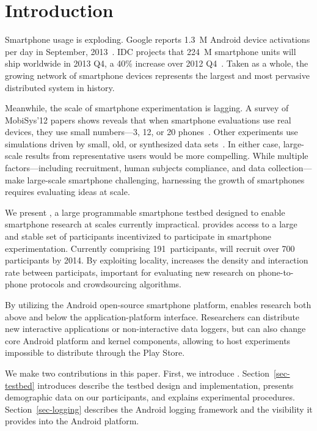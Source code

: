 \section{Introduction}
\label{sec-introduction}

Smartphone usage is exploding. Google reports 1.3~M Android device activations
per day in September, 2013~\cite{google-Sep2012-activations}. IDC projects that
224~M smartphone units will ship worldwide in 2013 Q4, a 40\% increase over
2012 Q4~\cite{idc-smartphone-growth}. Taken as a whole, the growing network of
smartphone devices represents the largest and most pervasive distributed system
in history.

Meanwhile, the scale of smartphone experimentation is lagging. A survey of
MobiSys'12 papers shows reveals that when smartphone evaluations use real
devices, they use small numbers---3, 12, or 20
phones~\cite{nowar-mobisys12,comon-mobisys12,caching-mobisys12}. Other
experiments use simulations driven by small, old, or synthesized data
sets~\cite{falcon-mobisys12,ace-mobisys12,humanmobility-mobisys12}. In either
case, large-scale results from representative users would be more compelling.
While multiple factors---including recruitment, human subjects compliance,
and data collection---make large-scale smartphone challenging, harnessing the
growth of smartphones requires evaluating ideas at scale.

We present \PhoneLab{}, a large programmable smartphone testbed designed to
enable smartphone research at scales currently impractical. \PhoneLab{}
provides access to a large and stable set of participants incentivized to
participate in smartphone experimentation. Currently comprising
191~participants, \PhoneLab{} will recruit over 700 participants by 2014. By
exploiting locality, \PhoneLab{} increases the density and interaction rate
between participats, important for evaluating new research on phone-to-phone
protocols and crowdsourcing algorithms.

By utilizing the Android open-source smartphone platform, \PhoneLab{} enables
research both above and below the application-platform interface. Researchers
can distribute new interactive applications or non-interactive data loggers,
but can also change core Android platform and kernel components, allowing
\PhoneLab{} to host experiments impossible to distribute through the Play
Store.

We make two contributions in this paper. First, we introduce \PhoneLab{}.
Section~\ref{sec-testbed} introduces describe the testbed design and
implementation, presents demographic data on our participants, and explains
experimental procedures. Section~\ref{sec-logging} describes the Android
logging framework and the visibility it provides into the Android platform.


